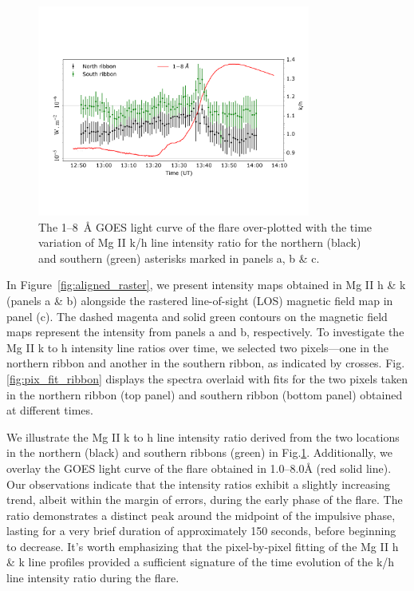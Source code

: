 \begin{figure}[ht!]
\centering  
\includegraphics[trim={1.5cm 4cm 0.5cm 4cm},clip,width=0.8\textwidth]{Figures/m_flare_iris_pt2.pdf}
\caption{The 1{--}8~{\AA} GOES light curve of the flare over-plotted with the time variation of Mg II k/h line intensity ratio for the northern (black) and southern (green) asterisks marked in panels a, b \& c.}
\label{fig:aligned_iris_ratio}
\end{figure}

In Figure~\ref{fig:aligned_raster}, we present intensity maps obtained in Mg II h \& k (panels a \& b) alongside the rastered line-of-sight (LOS) magnetic field map in panel (c). The dashed magenta and solid green contours on the magnetic field maps represent the intensity from panels a and b, respectively. To investigate the Mg II k to h intensity line ratios over time, we selected two pixels—one in the northern ribbon and another in the southern ribbon, as indicated by crosses. Fig.\ref{fig:pix_fit_ribbon} displays the spectra overlaid with fits for the two pixels taken in the northern ribbon (top panel) and southern ribbon (bottom panel) obtained at different times.

We illustrate the Mg II k to h line intensity ratio derived from the two locations in the northern (black) and southern ribbons (green) in Fig.\ref{fig:aligned_iris_ratio}. Additionally, we overlay the GOES light curve of the flare obtained in 1.0{--}8.0{\AA} (red solid line). Our observations indicate that the intensity ratios exhibit a slightly increasing trend, albeit within the margin of errors, during the early phase of the flare. The ratio demonstrates a distinct peak around the midpoint of the impulsive phase, lasting for a very brief duration of approximately 150 seconds, before beginning to decrease. It's worth emphasizing that the pixel-by-pixel fitting of the Mg II h \& k line profiles provided a sufficient signature of the time evolution of the k/h line intensity ratio during the flare.

